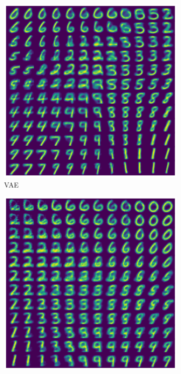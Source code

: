 \begin{figure}[!h]
	\begin{subfigure}[t]{0.49\textwidth}
		\centering
		\includegraphics[width = 1\textwidth]{figures/vae/interpolation}
		\caption{VAE}
	\end{subfigure}
	\begin{subfigure}[t]{0.49\textwidth}
		\centering
		\includegraphics[width = 1\textwidth]{figures/cvae/interpolation}

\end{subfigure}
\end{figure}
